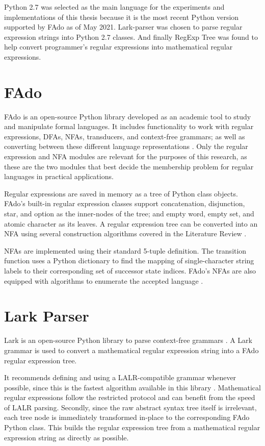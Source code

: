 Python 2.7 was selected as the main language for the experiments and implementations of this thesis because it is the most recent Python version supported by FAdo as of May 2021. Lark-parser was chosen to parse regular expression strings into Python 2.7 classes. And finally RegExp Tree was found to help convert programmer's regular expressions into mathematical regular expressions.

\section{FAdo}
\label{sec:FAdo}
FAdo is an open-source Python library developed as an academic tool to study and manipulate formal languages. It includes functionality to work with regular expressions, DFAs, NFAs, transducers, and context-free grammars; as well as converting between these different language representations \cite{fado}. Only the regular expression and NFA modules are relevant for the purposes of this research, as these are the two modules that best decide the membership problem for regular languages in practical applications.

Regular expressions are saved in memory as a tree of Python class objects. FAdo's built-in regular expression classes support concatenation, disjunction, star, and option as the inner-nodes of the tree; and empty word, empty set, and atomic character as its leaves. A regular expression tree can be converted into an NFA using several construction algorithms covered in the Literature Review \cite{fado}.

NFAs are implemented using their standard 5-tuple definition. The transition function uses a Python dictionary to find the mapping of single-character string labels to their corresponding set of successor state indices. FAdo's NFAs are also equipped with algorithms to enumerate the accepted language \cite{fado}.




\section{Lark Parser} 
\label{sec:Lark Parser}
Lark is an open-source Python library to parse context-free grammars \cite{lark}. A Lark grammar is used to convert a mathematical regular expression string into a FAdo regular expression tree. 

It recommends defining and using a LALR-compatible grammar whenever possible, since this is the fastest algorithm available in this library \cite{lark-docs}. Mathematical regular expressions follow the restricted protocol and can benefit from the speed of LALR parsing. Secondly, since the raw abstract syntax tree itself is irrelevant, each tree node is immediately transformed in-place to the corresponding FAdo Python class. This builds the regular expression tree from a mathematical regular expression string as directly as possible.





